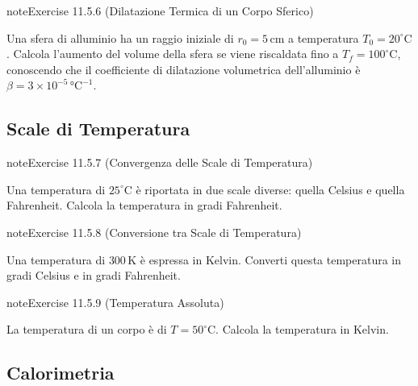 \documentclass[letterpaper,10pt,italian]{jupyterBook}
\begin{document}
\begin{sphinxadmonition}{note}{Exercise 11.5.6 (Dilatazione Termica di un Corpo Sferico)}



\sphinxAtStartPar
Una sfera di alluminio ha un raggio iniziale di \(r_0 = 5 \, \text{cm}\) a temperatura \(T_0 = 20^\circ \text{C}\). Calcola l’aumento del volume della sfera se viene riscaldata fino a \(T_f = 100^\circ \text{C}\), conoscendo che il coefficiente di dilatazione volumetrica dell’alluminio è \(\beta = 3 \times 10^{-5} \, \text{°C}^{-1}\).
\end{sphinxadmonition}


\subsection{Scale di Temperatura}
\label{\detokenize{ch/thermodynamics/foundation-problems:scale-di-temperatura}} \label{exercise:ch/thermodynamics/foundation-problems-exercise-6}

\begin{sphinxadmonition}{note}{Exercise 11.5.7 (Convergenza delle Scale di Temperatura)}



\sphinxAtStartPar
Una temperatura di \(25^\circ \text{C}\) è riportata in due scale diverse: quella Celsius e quella Fahrenheit. Calcola la temperatura in gradi Fahrenheit.
\end{sphinxadmonition}
 \label{exercise:ch/thermodynamics/foundation-problems-exercise-7}

\begin{sphinxadmonition}{note}{Exercise 11.5.8 (Conversione tra Scale di Temperatura)}



\sphinxAtStartPar
Una temperatura di \(300 \, \text{K}\) è espressa in Kelvin. Converti questa temperatura in gradi Celsius e in gradi Fahrenheit.
\end{sphinxadmonition}
 \label{exercise:ch/thermodynamics/foundation-problems-exercise-8}

\begin{sphinxadmonition}{note}{Exercise 11.5.9 (Temperatura Assoluta)}



\sphinxAtStartPar
La temperatura di un corpo è di \(T = 50^\circ \text{C}\). Calcola la temperatura in Kelvin.
\end{sphinxadmonition}


\subsection{Calorimetria}
\label{\detokenize{ch/thermodynamics/foundation-problems:id1}} \label{exercise:ch/thermodynamics/foundation-problems-exercise-9}
\end{document}

